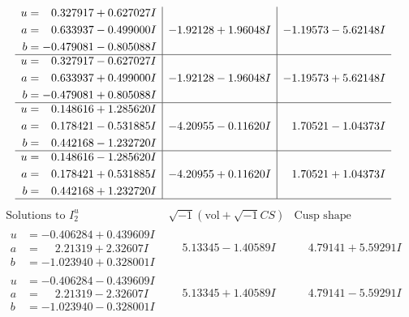 \documentclass[1p]{elsarticle_modified}
\theoremstyle{definition}
\newcommand{\I}{\sqrt{-1}}
\begin{document}
$$\begin{array}{c|c|c}
\begin{aligned}
u &= \phantom{-}0.327917 + 0.627027 I \\
a &= \phantom{-}0.633937 - 0.499000 I \\
b &= -0.479081 - 0.805088 I\end{aligned}
 & -1.92128 + 1.96048 I & -1.19573 - 5.62148 I \\ \hline\begin{aligned}
u &= \phantom{-}0.327917 - 0.627027 I \\
a &= \phantom{-}0.633937 + 0.499000 I \\
b &= -0.479081 + 0.805088 I\end{aligned}
 & -1.92128 - 1.96048 I & -1.19573 + 5.62148 I \\ \hline\begin{aligned}
u &= \phantom{-}0.148616 + 1.285620 I \\
a &= \phantom{-}0.178421 - 0.531885 I \\
b &= \phantom{-}0.442168 - 1.232720 I\end{aligned}
 & -4.20955 - 0.11620 I & \phantom{-}1.70521 - 1.04373 I \\ \hline\begin{aligned}
u &= \phantom{-}0.148616 - 1.285620 I \\
a &= \phantom{-}0.178421 + 0.531885 I \\
b &= \phantom{-}0.442168 + 1.232720 I\end{aligned}
 & -4.20955 + 0.11620 I & \phantom{-}1.70521 + 1.04373 I\\
 \hline 
 \end{array}$$\newpage$$\begin{array}{c|c|c}  
\text{Solutions to }I^u_{2}& \I (\text{vol} + \sqrt{-1}CS) & \text{Cusp shape}\\
 \hline 
\begin{aligned}
u &= -0.406284 + 0.439609 I \\
a &= \phantom{-}2.21319 + 2.32607 I \\
b &= -1.023940 + 0.328001 I\end{aligned}
 & \phantom{-}5.13345 - 1.40589 I & \phantom{-}4.79141 + 5.59291 I \\ \hline\begin{aligned}
u &= -0.406284 - 0.439609 I \\
a &= \phantom{-}2.21319 - 2.32607 I \\
b &= -1.023940 - 0.328001 I\end{aligned}
 & \phantom{-}5.13345 + 1.40589 I & \phantom{-}4.79141 - 5.59291 I \\ \hline\begin{aligned}

\end{aligned}
\end{array}$$
\end{document}
